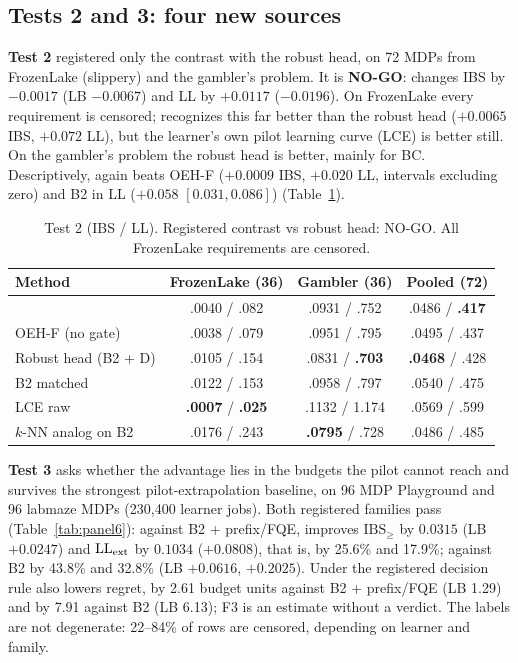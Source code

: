 \subsection{Tests 2 and 3: four new sources}
\label{sec:fifth}
\textbf{Test 2} registered only the contrast with the robust head, on 72 MDPs from FrozenLake (slippery) and the gambler's problem. It is \textbf{NO-GO}: \OEH{} changes IBS by $-0.0017$ (LB $-0.0067$) and LL by $+0.0117$ ($-0.0196$). On FrozenLake every requirement is censored; \OEH{} recognizes this far better than the robust head ($+0.0065$ IBS, $+0.072$ LL), but the learner's own pilot learning curve (LCE) is better still. On the gambler's problem the robust head is better, mainly for BC. Descriptively, \OEH{} again beats OEH-F ($+0.0009$ IBS, $+0.020$ LL, intervals excluding zero) and B2 in LL ($+0.058$ $[0.031,0.086]$) (Table~\ref{tab:fifth}).

\begin{table}[t]
\centering
\caption{Test 2 (IBS / LL). Registered contrast \OEH{} vs robust head: NO-GO. All FrozenLake requirements are censored.}
\label{tab:fifth}
\footnotesize
\setlength{\tabcolsep}{3pt}
\begin{tabular}{@{}lccc@{}}
\toprule
Method & FrozenLake (36) & Gambler (36) & Pooled (72)\\
\midrule
\OEH{} & .0040 / .082 & .0931 / .752 & .0486 / \textbf{.417}\\
OEH-F (no gate) & .0038 / .079 & .0951 / .795 & .0495 / .437\\
Robust head (B2 + D) & .0105 / .154 & .0831 / \textbf{.703} & \textbf{.0468} / .428\\
B2 matched & .0122 / .153 & .0958 / .797 & .0540 / .475\\
LCE raw & \textbf{.0007} / \textbf{.025} & .1132 / 1.174 & .0569 / .599\\
$k$-NN analog on B2 & .0176 / .243 & \textbf{.0795} / .728 & .0486 / .485\\
\bottomrule
\end{tabular}
\end{table}

\textbf{Test 3} asks whether the advantage lies in the budgets the pilot cannot reach and survives the strongest pilot-extrapolation baseline, on 96 MDP Playground and 96 labmaze MDPs (230{,}400 learner jobs). Both registered families pass (Table~\ref{tab:panel6}): against B2 + prefix/FQE, \OEH{} improves $\mathrm{IBS}_\ge$ by $0.0315$ (LB $+0.0247$) and $\mathrm{LL}_{\rm ext}$ by $0.1034$ ($+0.0808$), that is, by 25.6\% and 17.9\%; against B2 by 43.8\% and 32.8\% (LB $+0.0616$, $+0.2025$). Under the registered decision rule \OEH{} also lowers regret, by 2.61 budget units against B2 + prefix/FQE (LB 1.29) and by 7.91 against B2 (LB 6.13); F3 is an estimate without a verdict. The labels are not degenerate: 22--84\% of rows are censored, depending on learner and family.

